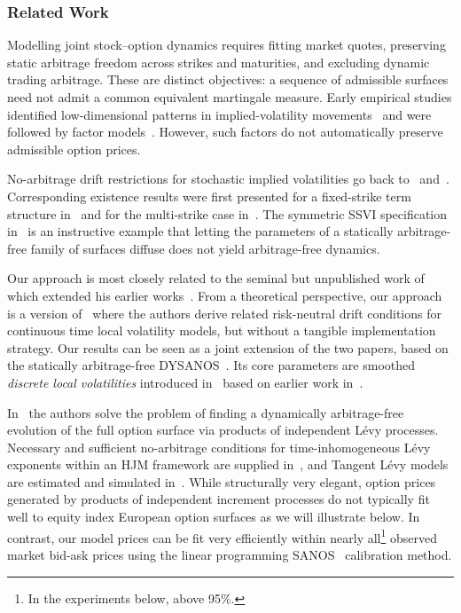\documentclass[11pt]{article}
\theoremstyle{plain}
\theoremstyle{definition}
\theoremstyle{remark}
\begin{document}
\subsubsection*{Related Work}
Modelling joint stock--option dynamics requires fitting market quotes, preserving static arbitrage freedom across strikes and maturities, and excluding dynamic trading arbitrage. These are distinct objectives: a sequence of admissible surfaces need not admit a common equivalent martingale measure. Early empirical studies identified low-dimensional patterns in implied-volatility movements~\citep{SkiadopoulosHodgesClewlow2000,ContDaFonseca2002Dynamics,FenglerHardleVilla2003} and were followed by factor models~\citep{ContVol,Hafner2004,FenglerHardleMammen2007}. However, such factors do not automatically preserve admissible option prices. 

No-arbitrage drift restrictions for stochastic implied volatilities go back to~\cite{Schonbucher1999} and~\cite{ledoit2002relative}. Corresponding existence results were first presented for a fixed-strike term structure in~\cite{SchweizerWisselTerm2008} and for the multi-strike case in~\cite{SchweizerWissel2008}. The symmetric SSVI specification in~\cite{DysLitElAmrani2021} is an instructive example that letting the parameters of a statically arbitrage-free family of surfaces diffuse does not yield arbitrage-free dynamics. 

Our approach is most closely related to the seminal but unpublished work of~\cite{Wissel2007} which extended his earlier works~\citep{SchweizerWissel2008, SchweizerWisselTerm2008}. From a theoretical perspective, our approach is a version of~\cite{CarmonaNadtochiy2009} where the authors derive related risk-neutral drift conditions for continuous time local volatility models, but without a tangible implementation strategy. Our results can be seen as a joint extension of the two papers, based on the statically arbitrage-free DYSANOS~\citep{DYSANOS2026}. Its core parameters are smoothed \emph{discrete local volatilities} introduced in~\cite{SANOS2026} based on earlier work in~\cite{AndreasenHuge, DLV}.

In~\cite{TangentLevy} the authors solve the problem of finding a dynamically arbitrage-free evolution of the full option surface via products of independent L\'evy processes. Necessary and sufficient no-arbitrage conditions for time-inhomogeneous L\'evy exponents within an HJM framework are supplied in~\cite{KallsenKruhner2015}, and Tangent L\'evy models are estimated and simulated in~\cite{CarmonaMaNadtochiy2017}. 
While structurally
very elegant, option prices generated by products of independent increment processes do not typically fit well to equity index European option surfaces as we will illustrate below. In contrast, our model prices can be fit very efficiently within nearly all\footnote{In the experiments below, above 95\%.} observed market bid-ask prices using the linear programming SANOS~\citep{DLV, SANOS2026} calibration method. 
\end{document}

